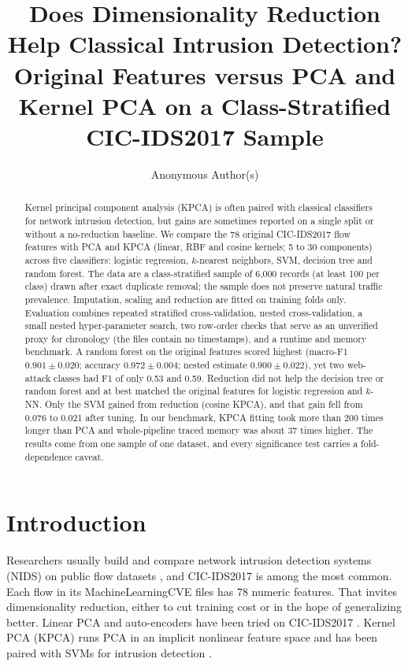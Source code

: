 \documentclass[runningheads]{llncs}
\begin{document}
\title{Does Dimensionality Reduction Help Classical Intrusion Detection? Original Features versus PCA and Kernel PCA on a Class-Stratified CIC-IDS2017 Sample}
\titlerunning{~}
\ifdefined\BLIND
\author{Anonymous Author(s)}
\authorrunning{~}
\institute{}
\else
\author{}
\authorrunning{~}
\institute{}
\fi
\maketitle
\begin{abstract}
Kernel principal component analysis (KPCA) is often paired with classical classifiers for network intrusion detection, but gains are sometimes reported on a single split or without a no-reduction baseline. We compare the 78 original CIC-IDS2017 flow features with PCA and KPCA (linear, RBF and cosine kernels; 5 to 30 components) across five classifiers: logistic regression, $k$-nearest neighbors, SVM, decision tree and random forest. The data are a class-stratified sample of 6,000 records (at least 100 per class) drawn after exact duplicate removal; the sample does not preserve natural traffic prevalence. Imputation, scaling and reduction are fitted on training folds only. Evaluation combines repeated stratified cross-validation, nested cross-validation, a small nested hyper-parameter search, two row-order checks that serve as an unverified proxy for chronology (the files contain no timestamps), and a runtime and memory benchmark. A random forest on the original features scored highest (macro-F1 $0.901\pm0.020$; accuracy $0.972\pm0.004$; nested estimate $0.900\pm0.022$), yet two web-attack classes had F1 of only 0.53 and 0.59. Reduction did not help the decision tree or random forest and at best matched the original features for logistic regression and $k$-NN. Only the SVM gained from reduction (cosine KPCA), and that gain fell from 0.076 to 0.021 after tuning. In our benchmark, KPCA fitting took more than 200 times longer than PCA and whole-pipeline traced memory was about 37 times higher. The results come from one sample of one dataset, and every significance test carries a fold-dependence caveat.

\end{abstract}

\section{Introduction}
Researchers usually build and compare network intrusion detection systems (NIDS) on public flow datasets \cite{ring2019}, and CIC-IDS2017 \cite{sharafaldin2018} is among the most common. Each flow in its MachineLearningCVE files has 78 numeric features. That invites dimensionality reduction, either to cut training cost or in the hope of generalizing better. Linear PCA and auto-encoders have been tried on CIC-IDS2017 \cite{abdulhammed2019}. Kernel PCA (KPCA) \cite{scholkopf1998} runs PCA in an implicit nonlinear feature space and has been paired with SVMs for intrusion detection \cite{kuang2014}.
\end{document}
